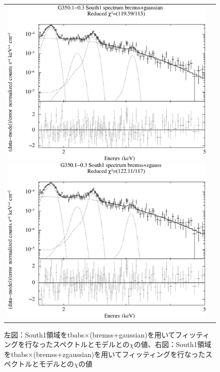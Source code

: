 \documentclass[a4j]{jarticle}%
\begin{document}
\begin{figure}[H]
\begin{center}
\begin{tabular}{cc}

\begin{minipage}{0.5\hsize}
\begin{center}
\includegraphics[scale=0.30]{./ps/South1_bremss+gaussian.eps}
\end{center}
\end{minipage}

\begin{minipage}{0.5\hsize}
\begin{center}
\includegraphics[scale=0.30]{./ps/South1_bremss+zgaussian.eps}
\end{center}
\end{minipage}
\end{tabular}
\caption{左図：South1領域をtbabs$\times$(bremss+gaussian)を用いてフィッティングを行なったスペクトルとモデルとの$\chi$の値、右図：South1領域をtbabs$\times$(bremss+zgaussian)を用いてフィッティングを行なったスペクトルとモデルとの$\chi$の値}
\label{fig:brem_South1}
\end{center}
\end{figure}
\end{document}
